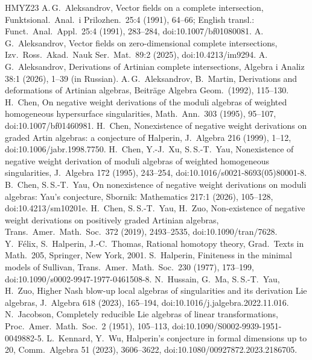 \documentclass[11pt]{article}
\theoremstyle{remark}
\begin{document}
{\small
\begin{thebibliography}{HMYZ23}
 A.\,G.~Aleksandrov, Vector fields on a complete intersection, Funktsional.\ Anal.\ i Prilozhen.\ 25:4 (1991), 64--66; English transl.: Funct.\ Anal.\ Appl.\ 25:4 (1991), 283--284, doi:10.1007/bf01080081.
 A.\,G.~Aleksandrov, Vector fields on zero-dimensional complete intersections, Izv.\ Ross.\ Akad.\ Nauk Ser.\ Mat.\ 89:2 (2025), doi:10.4213/im9294.
 A.\,G.~Aleksandrov, Derivations of Artinian complete intersections, Algebra i Analiz 38:1 (2026), 1--39 (in Russian).
 A.\,G.~Aleksandrov, B.~Martin, Derivations and deformations of Artinian algebras, Beitr\"age Algebra Geom.\ (1992), 115--130.
 H.~Chen, On negative weight derivations of the moduli algebras of weighted homogeneous hypersurface singularities, Math.\ Ann.\ 303 (1995), 95--107, doi:10.1007/bf01460981.
 H.~Chen, Nonexistence of negative weight derivations on graded Artin algebras: a conjecture of Halperin, J.\ Algebra 216 (1999), 1--12, doi:10.1006/jabr.1998.7750.
 H.~Chen, Y.-J.~Xu, S.\,S.-T.~Yau, Nonexistence of negative weight derivation of moduli algebras of weighted homogeneous singularities, J.\ Algebra 172 (1995), 243--254, doi:10.1016/s0021-8693(05)80001-8.
 B.~Chen, S.\,S.-T.~Yau, On nonexistence of negative weight derivations on moduli algebras: Yau's conjecture, Sbornik: Mathematics 217:1 (2026), 105--128, doi:10.4213/sm10201e.
 H.~Chen, S.\,S.-T.~Yau, H.~Zuo, Non-existence of negative weight derivations on positively graded Artinian algebras, Trans.\ Amer.\ Math.\ Soc.\ 372 (2019), 2493--2535, doi:10.1090/tran/7628.
 Y.~F\'elix, S.~Halperin, J.-C.~Thomas, Rational homotopy theory, Grad.\ Texts in Math.\ 205, Springer, New York, 2001.
 S.~Halperin, Finiteness in the minimal models of Sullivan, Trans.\ Amer.\ Math.\ Soc.\ 230 (1977), 173--199, doi:10.1090/s0002-9947-1977-0461508-8.
 N.~Hussain, G.~Ma, S.\,S.-T.~Yau, H.~Zuo, Higher Nash blow-up local algebras of singularities and its derivation Lie algebras, J.\ Algebra 618 (2023), 165--194, doi:10.1016/j.jalgebra.2022.11.016.
 N.~Jacobson, Completely reducible Lie algebras of linear transformations, Proc.\ Amer.\ Math.\ Soc.\ 2 (1951), 105--113, doi:10.1090/S0002-9939-1951-0049882-5.
 L.~Kennard, Y.~Wu, Halperin's conjecture in formal dimensions up to 20, Comm.\ Algebra 51 (2023), 3606--3622, doi:10.1080/00927872.2023.2186705.

\end{thebibliography}}
\end{document}

